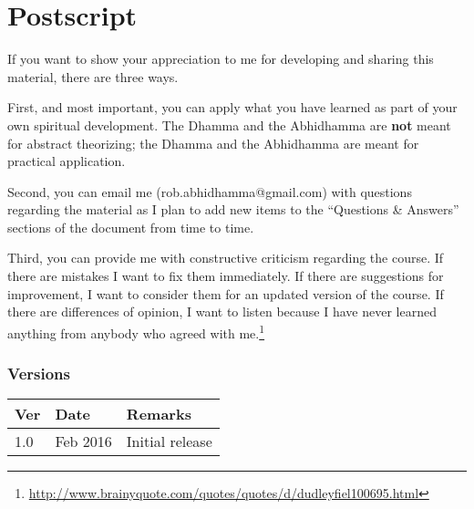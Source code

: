 \section{Postscript}

If you want to show your appreciation to me for developing and sharing this material, there are three ways.

First, and most important, you can apply what you have learned as part of your own spiritual development. The Dhamma and the Abhidhamma are \textbf{not} meant for abstract theorizing; the Dhamma and the Abhidhamma are meant for practical application.

Second, you can email me (rob.abhidhamma@gmail.com) with questions regarding the material as I plan to add new items to the “Questions \& Answers” sections of the document from time to time.

Third, you can provide me with constructive criticism regarding the course. If there are mistakes I want to fix them immediately. If there are suggestions for improvement, I want to consider them for an updated version of the course. If there are differences of opinion, I want to listen because I have never learned anything from anybody who agreed with me.\footnote{\url{http://www.brainyquote.com/quotes/quotes/d/dudleyfiel100695.html}}
\\
\vspace{10mm}
\subsubsection*{Versions}
\begin{tabular*}{\textwidth}{lll}
\toprule
\textbf{Ver} & \textbf{Date} & \textbf{Remarks} \\ 
\midrule
1.0 & Feb 2016 & Initial release \\ 
\bottomrule
\end{tabular*} 

